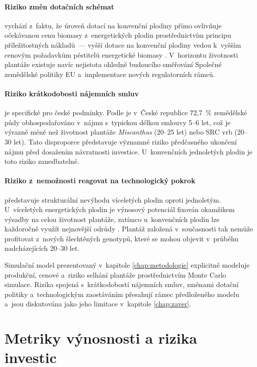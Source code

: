 \paragraph{Riziko změn dotačních schémat}
vychází z~faktu, že úroveň dotací na konvenční plodiny přímo ovlivňuje
očekávanou cenu biomasy z~energetických plodin prostřednictvím principu
příležitostných nákladů~--- vyšší dotace na konvenční plodiny vedou
k~vyšším cenovým požadavkům pěstitelů energetické biomasy
\citep{knapek_2024}. V~horizontu životnosti plantáže existuje navíc
nejistota ohledně budoucího směřování Společné zemědělské politiky EU
a~implementace nových regulatorních rámců.

\paragraph{Riziko krátkodobosti nájemních smluv}
je specifické pro české podmínky. Podle \citet{knapek_2024} je
v~České republice 72,7~\% zemědělské půdy obhospodařováno v~nájmu
s~typickou délkou smlouvy 5--6 let, což je výrazně méně než životnost
plantáže \textit{Miscanthus} (20--25 let) nebo SRC vrb (20--30 let).
Tato disproporce představuje významné riziko předčasného ukončení
nájmu před dosažením návratnosti investice. U~konvenčních jednoletých
plodin je toto riziko zanedbatelné.

\paragraph{Riziko z~nemožnosti reagovat na technologický pokrok}
představuje strukturální nevýhodu víceletých plodin oproti jednoletým.
U~víceletých energetických plodin je výnosový potenciál fixován
okamžikem výsadby na celou životnost plantáže, zatímco u~konvenčních
plodin lze každoročně využít nejnovější odrůdy \citep{knapek_2024}.
Plantáž založená v~současnosti tak nemůže profitovat z~nových
šlechtěných genotypů, které se mohou objevit v~průběhu nadcházejících
20--30 let.

Simulační model prezentovaný v~kapitole \ref{chap:metodologie}
explicitně modeluje produkční, cenové a~riziko selhání plantáže
prostřednictvím Monte Carlo simulace. Rizika spojená s~krátkodobostí
nájemních smluv, změnami dotační politiky a~technologickým zaostáváním
přesahují rámec předloženého modelu a~jsou diskutována jako jeho
limitace v~kapitole \ref{chap:zaver}.

\section{Metriky výnosnosti a rizika investic}
\label{sec:metriky}

